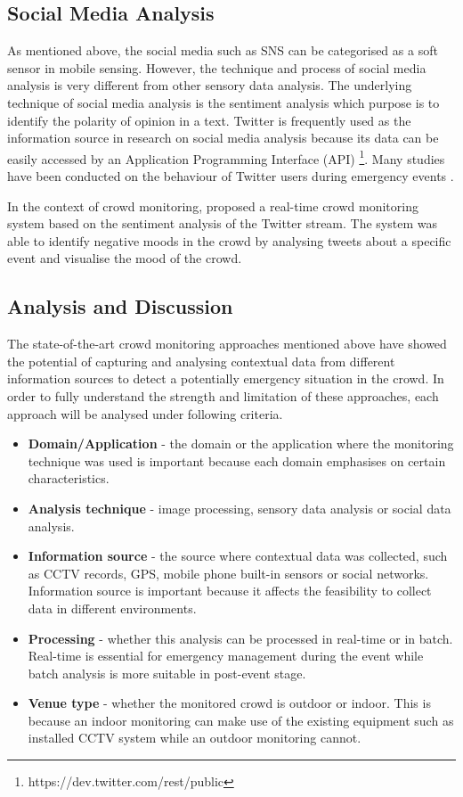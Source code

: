 \subsection{Social Media Analysis}
As mentioned above, the social media such as SNS can be categorised as a soft sensor in mobile sensing. However, the technique and process of social media analysis is very different from other sensory data analysis. The underlying technique of social media analysis is the sentiment analysis which purpose is to identify the polarity of opinion in a text. Twitter is frequently used as the information source in research on social media analysis because its data can be easily accessed by an Application Programming Interface (API) \footnote{https://dev.twitter.com/rest/public}. Many studies have been conducted on the behaviour of Twitter users during emergency events \parencite{Hughes2009,Sakaki2010,Vieweg2010,Yin2012}.

In the context of crowd monitoring, \textcite{DelirHaghighi2013} proposed a real-time crowd monitoring system based on the sentiment analysis of the Twitter stream. The system was able to identify negative moods in the crowd by analysing tweets about a specific event and visualise the mood of the crowd.

\subsection{Analysis and Discussion}
The state-of-the-art crowd monitoring approaches mentioned above have showed the potential of capturing and analysing contextual data from different information sources to detect a potentially emergency situation in the crowd. In order to fully understand the strength and limitation of these approaches, each approach will be analysed under following criteria.

\begin{itemize}
	\item \textbf{Domain/Application} - the domain or the application where the monitoring technique was used is important because each domain emphasises on certain characteristics. 
	\item \textbf{Analysis technique} - image processing, sensory data analysis or social data analysis.
	\item \textbf{Information source} - the source where contextual data was collected, such as CCTV records, GPS, mobile phone built-in sensors or social networks. Information source is important because it affects the feasibility to collect data in different environments.
	\item \textbf{Processing} - whether this analysis can be processed in real-time or in batch. Real-time is essential for emergency management during the event while batch analysis is more suitable in post-event stage.
	\item \textbf{Venue type} - whether the monitored crowd is outdoor or indoor. This is because an indoor monitoring can make use of the existing equipment such as installed CCTV system while an outdoor monitoring cannot.
\end{itemize}

